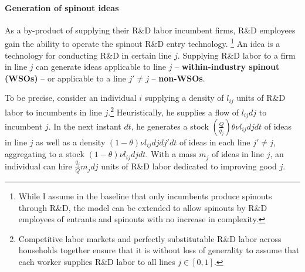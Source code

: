 \documentclass[12pt,english]{article}
\theoremstyle{remark}
\begin{document}
\paragraph{Generation of spinout ideas}

As a by-product of supplying their R\&D labor incumbent firms, R\&D employees gain the ability to operate the spinout R\&D entry technology. \footnote{While I assume in the baseline that only incumbents produce spinouts through R\&D, the model can be extended to allow spinouts by R\&D employees of entrants and spinouts with no increase in complexity.} An idea is a technology for conducting R\&D in certain line $j$. Supplying R\&D labor to a firm in line $j$ can generate ideas applicable to line $j$ -- \textbf{within-industry spinout (WSOs)} -- or applicable to a line $j' \ne j$ -- \textbf{non-WSOs}. 

To be precise, consider an individual $i$ supplying a density of $l_{ij}$ units of R\&D labor to incumbents in line $j$.\footnote{Competitive labor markets and perfectly substitutable R\&D labor across households together ensure that it is without loss of generality to assume that each worker supplies R\&D labor to all lines $j \in [0,1]$.} Heuristically, he supplies a flow of $l_{ij} dj$ to incumbent $j$. In the next instant $dt$, he generates a stock $(\frac{Q}{q_j}) \theta \nu l_{ij} dj dt$ of ideas in line $j$ as well as a density $(1-\theta)\nu l_{ij} dj dj' dt$ of ideas in each line $j' \ne j$, aggregating to a stock $(1-\theta) \nu l_{ij} dj dt$. With a mass $m_j$ of ideas in line $j$, an individual can hire $\frac{q_j}{Q}m_jdj$ units of R\&D labor dedicated to improving good $j$.  
\end{document}
